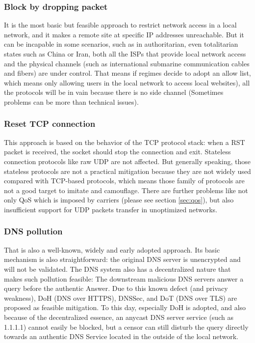 \documentclass[conference]{IEEEtran}
\begin{document}
\subsubsection{Block by dropping packet}
It is the most basic but feasible approach to restrict network access in a local network, and it makes a remote site at specific IP addresses unreachable.
But it can be incapable in some scenarios, such as in authoritarian, even totalitarian states such as China or Iran, both all the ISPs that provide local network access and the physical channels (such as international submarine communication cables and fibers) are under control.
That means if regimes decide to adopt an allow list, which means only allowing users in the local network to access local websites), all the protocols will be in vain because there is no side channel (Sometimes problems can be more than technical issues).

\subsubsection{Reset TCP connection}
This approach is based on the behavior of the TCP protocol stack: when a RST packet is received, the socket should stop the connection and exit. Stateless connection protocols like raw UDP are not affected. But generally speaking, those stateless protocols are not a practical mitigation because they are not widely used compared with TCP-based protocols, which means those family of protocols are not a good target to imitate and camouflage. There are further problems like not only QoS which is imposed by carriers (please see section \ref{sec:qos}), but also insufficient support for UDP packets transfer in unoptimized networks.

\subsubsection{DNS pollution}
That is also a well-known, widely and early adopted approach. Its basic mechanism is also straightforward: the original DNS server is unencrypted and will not be validated. The DNS system also has a decentralized nature that makes such pollution feasible: The downstream malicious DNS servers answer a query before the authentic Answer.
Due to this known defect (and privacy weakness), DoH (DNS over HTTPS), DNSSec, and DoT (DNS over TLS)  are proposed as feasible mitigation. To this day, especially DoH is adopted, and also because of the decentralized essence, an anycast DNS server service (such as 1.1.1.1) cannot easily be blocked, but a censor can still disturb the query directly towards an authentic DNS Service located in the outside of the local network.
\end{document}
